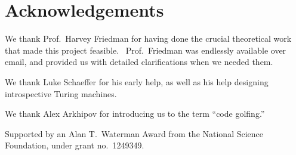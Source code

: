 \documentclass[11pt]{article}
\begin{document}
\section{Acknowledgements}


We thank Prof.\ Harvey Friedman for having done the crucial theoretical work that made this project feasible. \ Prof.\ Friedman was endlessly available over email, and provided us with detailed clarifications when we needed them.

We thank Luke Schaeffer for his early help, as well as his help designing introspective Turing machines.

We thank Alex Arkhipov for introducing us to the term ``code golfing.''

Supported by an Alan T.\ Waterman Award from the National Science Foundation, under grant no.\ 1249349.
\end{document}
